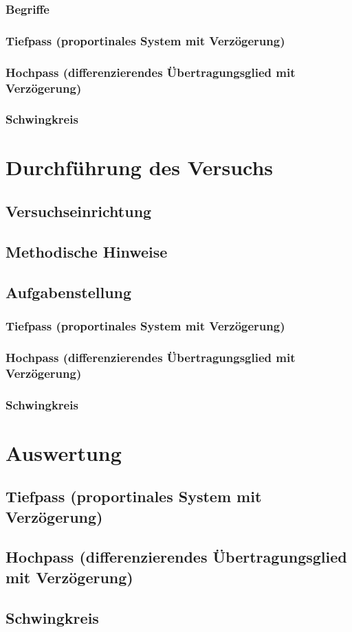 \subsubsection{Begriffe}
\subsubsection{Tiefpass (proportinales System mit Verzögerung)}
\subsubsection{Hochpass (differenzierendes Übertragungsglied mit Verzögerung)}
\subsubsection{Schwingkreis}
\section{Durchführung des Versuchs}
\subsection{Versuchseinrichtung}
\subsection{Methodische Hinweise}
\subsection{Aufgabenstellung}
\subsubsection{Tiefpass (proportinales System mit Verzögerung)}
\subsubsection{Hochpass (differenzierendes Übertragungsglied mit Verzögerung)}
\subsubsection{Schwingkreis}
\section{Auswertung}
\subsection{Tiefpass (proportinales System mit Verzögerung)}
\subsection{Hochpass (differenzierendes Übertragungsglied mit Verzögerung)}
\subsection{Schwingkreis}

